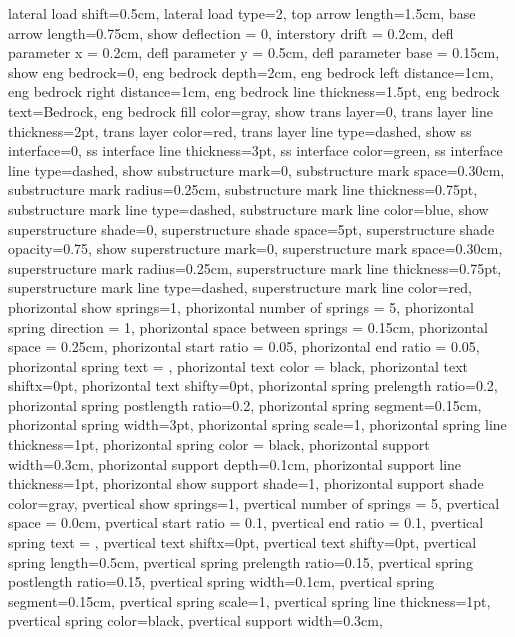 {{  lateral load shift=0.5cm,
  lateral load type=2,
  top arrow length=1.5cm,
  base arrow length=0.75cm,
  show deflection = 0, 
  interstory drift = 0.2cm,
  defl parameter x = 0.2cm,
  defl parameter y = 0.5cm,
  defl parameter base = 0.15cm,
  show eng bedrock=0,
  eng bedrock depth=2cm,
  eng bedrock left distance=1cm,
  eng bedrock right distance=1cm,
  eng bedrock line thickness=1.5pt,
  eng bedrock text=Bedrock,
  eng bedrock fill color=gray,
  show trans layer=0,
  trans layer line thickness=2pt,
  trans layer color=red,
  trans layer line type=dashed,
  show ss interface=0,
  ss interface line thickness=3pt,
  ss interface color=green,
  ss interface line type=dashed,
  show substructure mark=0,
  substructure mark space=0.30cm,
  substructure mark radius=0.25cm,
  substructure mark line thickness=0.75pt,
  substructure mark line type=dashed,
  substructure mark line color=blue,
  show superstructure shade=0,
  superstructure shade space=5pt,
  superstructure shade opacity=0.75,
  show superstructure mark=0,
  superstructure mark space=0.30cm,
  superstructure mark radius=0.25cm,
  superstructure mark line thickness=0.75pt,
  superstructure mark line type=dashed,
  superstructure mark line color=red,
  phorizontal show springs=1,
  phorizontal number of springs = 5,
  phorizontal spring direction = 1,
  phorizontal space between springs = 0.15cm,
  phorizontal space = 0.25cm,
  phorizontal start ratio = 0.05,
  phorizontal end ratio = 0.05,
  phorizontal spring text = {},
  phorizontal text color = black,
  phorizontal text shiftx=0pt,
  phorizontal text shifty=0pt,
  phorizontal spring prelength ratio=0.2,
  phorizontal spring postlength ratio=0.2,
  phorizontal spring segment=0.15cm,
  phorizontal spring width=3pt,
  phorizontal spring scale=1,
  phorizontal spring line thickness=1pt,
  phorizontal spring color = black,
  phorizontal support width=0.3cm,
  phorizontal support depth=0.1cm,
  phorizontal support line thickness=1pt,
  phorizontal show support shade=1,
  phorizontal support shade color=gray,
  pvertical show springs=1,
  pvertical number of springs = 5,
  pvertical space = 0.0cm,
  pvertical start ratio = 0.1,
  pvertical end ratio = 0.1,
  pvertical spring text = {},
  pvertical text shiftx=0pt,
  pvertical text shifty=0pt,
  pvertical spring length=0.5cm,
  pvertical spring prelength ratio=0.15,
  pvertical spring postlength ratio=0.15,
  pvertical spring width=0.1cm,
  pvertical spring segment=0.15cm,
  pvertical spring scale=1,
  pvertical spring line thickness=1pt,
  pvertical spring color=black,
  pvertical support width=0.3cm,
}}
